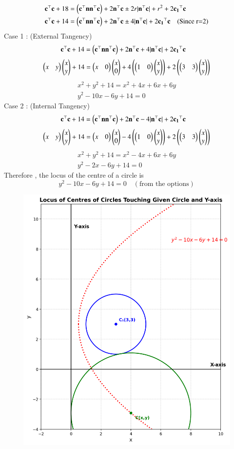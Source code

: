 \documentclass[journal]{IEEEtran}
\begin{document}
\begin{align}
\mathbf{c}^\top\mathbf{c}+18&=\left(\mathbf{c}^\top\mathbf{n}\mathbf{n}^\top\mathbf{c}\right)+2\mathbf{n}^\top\mathbf{c} \pm 2r|\mathbf{n}^\top\mathbf{c}|+ r^2 + 2\mathbf{c_1}^\top\mathbf{c}\\
\mathbf{c}^\top\mathbf{c}+14&=\left(\mathbf{c}^\top\mathbf{n}\mathbf{n}^\top\mathbf{c}\right)+2\mathbf{n}^\top\mathbf{c} \pm 4|\mathbf{n}^\top\mathbf{c}| + 2\mathbf{c_1}^\top\mathbf{c} \quad (\text{Since r=2})
\end{align}
Case 1 : (External Tangency)
\begin{align}
\mathbf{c}^\top\mathbf{c}+14&=\left(\mathbf{c}^\top\mathbf{n}\mathbf{n}^\top\mathbf{c}\right)+2\mathbf{n}^\top\mathbf{c} + 4|\mathbf{n}^\top\mathbf{c}| + 2\mathbf{c_1}^\top\mathbf{c}
\end{align}
\begin{align}
\begin{pmatrix}x&y\end{pmatrix}\begin{pmatrix}x\\y\end{pmatrix} +14 = \begin{pmatrix}x&0\end{pmatrix}\begin{pmatrix}x\\0\end{pmatrix} + 4 \left(\begin{pmatrix}1 & 0\end{pmatrix}\begin{pmatrix}x\\y\end{pmatrix}\right) + 2\left(\begin{pmatrix}3&3\end{pmatrix}\begin{pmatrix}x\\y\end{pmatrix}\right)
\end{align}
\begin{align}
x^2+y^2+14=x^2+4x+6x+6y\\
y^2-10x-6y+14=0
\end{align}
Case 2 : (Internal Tangency)
\begin{align}
\mathbf{c}^\top\mathbf{c}+14&=\left(\mathbf{c}^\top\mathbf{n}\mathbf{n}^\top\mathbf{c}\right)+2\mathbf{n}^\top\mathbf{c} - 4|\mathbf{n}^\top\mathbf{c}| + 2\mathbf{c_1}^\top\mathbf{c}
\end{align}
\begin{align}
\begin{pmatrix}x&y\end{pmatrix}\begin{pmatrix}x\\y\end{pmatrix} +14 = \begin{pmatrix}x&0\end{pmatrix}\begin{pmatrix}x\\0\end{pmatrix} - 4 \left(\begin{pmatrix}1 & 0\end{pmatrix}\begin{pmatrix}x\\y\end{pmatrix}\right) + 2\left(\begin{pmatrix}3&3\end{pmatrix}\begin{pmatrix}x\\y\end{pmatrix}\right)
\end{align}
\begin{align}
x^2+y^2+14=x^2-4x+6x+6y\\
y^2-2x-6y+14=0
\end{align}
Therefore , the locus of the centre of a circle is 
$$
 y^2-10x-6y+14=0   \quad  (\text{from the options})
$$
\begin{figure}[H]
   \centering
   \includegraphics[width=0.7\columnwidth]{figs/fig.png}
	\caption{}
   \label{}
\end{figure}
\end{document}
